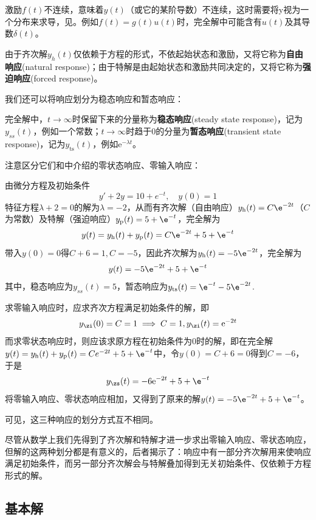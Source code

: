激励$f(t)$不连续，意味着$y(t)$（或它的某阶导数）不连续，这时需要将y视为一个分布来求导，见。例如$f(t)=g(t)u(t)$时，完全解中可能含有$u(t)$及其导数$\delta(t)$。

\begin{definition}[自由响应与强迫相应]
    由于齐次解$y_h(t)$仅依赖于方程的形式，不依起始状态和激励，又将它称为\textbf{自由响应}(natural response)；由于特解是由起始状态和激励共同决定的，又将它称为\textbf{强迫响应}(forced response)。
\end{definition}

我们还可以将响应划分为稳态响应和暂态响应：
\begin{definition}[稳态响应和暂态响应]
完全解中，$t\to\infty$时保留下来的分量称为\textbf{稳态响应}(steady state response)，记为$y_{ss}(t)$，例如一个常数；$t\to\infty$时趋于0的分量为\textbf{暂态响应}(transient state response)，记为$y_{\text{ts}}(t)$，例如$\mathrm{e}^{-\lambda t}$。
\end{definition}

注意区分它们和中介绍的零状态响应、零输入响应：

\begin{example}[三种响应划分方式的区别]
    由微分方程及初始条件
    \[y'+2y=10+e^{-t},\quad y(0)=1\]
    特征方程$\lambda+2=0$的解为$\lambda=-2$，从而有齐次解（自由响应）$y_{\text{h}}(t)=C\e^{-2t}$（$C$为常数）及特解（强迫响应）$y_{\text{p}}(t)=5+\e^{-t}$，完全解为
    $$y(t)=y_{\text{h}}(t)+y_{\text{p}}(t)=C\e^{-2t}+5+\e^{-t}$$
    带入$y(0)=0$得$C+6=1,C=-5$，因此齐次解为$y_{\text{h}}(t)=-5\e^{-2t}$，完全解为
    \[y(t)=-5\e^{-2t}+5+\e^{-t}\]
    其中，稳态响应为$y_{ss}(t)=5$，暂态响应为$y_{\text{ts}}(t)=\e^{-t}-5\e^{-2t}$.

    求零输入响应时，应求齐次方程满足初始条件的解，即
    $$y_{\zi}(0)=C=1\implies C=1,y_{\zi}(t)=\mathrm{e}^{-2t}$$
    而求零状态响应时，则应该求原方程在初始条件为0时的解，即在完全解$y(t)=y_{\text{h}}(t)+y_{\text{p}}(t)=Ce^{-2t}+5+\e^{-t}$中，令$y(0)=C+6=0$得到$C=-6$，于是
    $$y_{\zs}(t)=-6\mathrm{e}^{-2t}+5+\e^{-t}$$
    将零输入响应、零状态响应相加，又得到了原来的解$y(t)=-5\e^{-2t}+5+\e^{-t}$。

    可见，这三种响应的划分方式互不相同。
\end{example}
尽管从数学上我们先得到了齐次解和特解才进一步求出零输入响应、零状态响应，但解的这两种划分都是有意义的，后者揭示了：响应中有一部分齐次解用来使响应满足初始条件，而另一部分齐次解会与特解叠加得到无关初始条件、仅依赖于方程形式的解。

\subsection{基本解}\label{sub:fundamental_solution}

